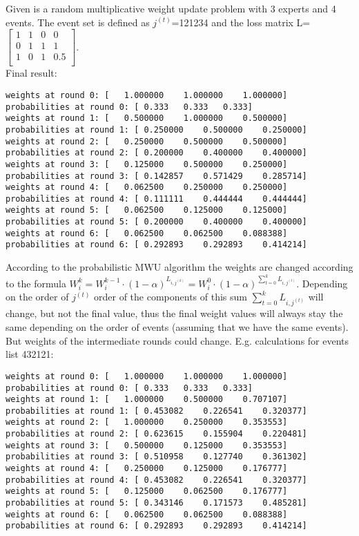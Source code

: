 
Given is a random multiplicative weight update problem with 3 experts and 4 events. The event set is defined as $j^{(t)}$=121234 and the loss matrix L=$ \begin{bmatrix}
1 & 1 & 0 & 0\\
0 & 1 & 1 & 1\\
1 & 0 & 1 & 0.5\\
\end{bmatrix}
$.\\
Final result:
\begin{verbatim}
weights at round 0: [	1.000000	1.000000	1.000000]
probabilities at round 0: [	0.333	0.333	0.333]
weights at round 1: [	0.500000	1.000000	0.500000]
probabilities at round 1: [	0.250000	0.500000	0.250000]
weights at round 2: [	0.250000	0.500000	0.500000]
probabilities at round 2: [	0.200000	0.400000	0.400000]
weights at round 3: [	0.125000	0.500000	0.250000]
probabilities at round 3: [	0.142857	0.571429	0.285714]
weights at round 4: [	0.062500	0.250000	0.250000]
probabilities at round 4: [	0.111111	0.444444	0.444444]
weights at round 5: [	0.062500	0.125000	0.125000]
probabilities at round 5: [	0.200000	0.400000	0.400000]
weights at round 6: [	0.062500	0.062500	0.088388]
probabilities at round 6: [	0.292893	0.292893	0.414214]
\end{verbatim}
According to the probabilistic MWU algorithm the weights are changed according to the formula $W_i^k = W_i^{k-1} \cdot (1 - \alpha)^{L_{i,j^{(k)}}} = W_i^0 \cdot (1-\alpha)^{\sum_{t=0}^k L_{i,j^{(t)}}}$. Depending on the order of $j^{(t)}$ order of the components of this sum $\sum_{t=0}^k L_{i,j^{(t)}}$ will change, but not the final value, thus the final weight values will always stay the same depending on the order of events (assuming that we have the same events). But weights of the intermediate rounds could change. E.g. calculations for events list 432121:

\begin{verbatim}
weights at round 0: [	1.000000	1.000000	1.000000]
probabilities at round 0: [	0.333	0.333	0.333]
weights at round 1: [	1.000000	0.500000	0.707107]
probabilities at round 1: [	0.453082	0.226541	0.320377]
weights at round 2: [	1.000000	0.250000	0.353553]
probabilities at round 2: [	0.623615	0.155904	0.220481]
weights at round 3: [	0.500000	0.125000	0.353553]
probabilities at round 3: [	0.510958	0.127740	0.361302]
weights at round 4: [	0.250000	0.125000	0.176777]
probabilities at round 4: [	0.453082	0.226541	0.320377]
weights at round 5: [	0.125000	0.062500	0.176777]
probabilities at round 5: [	0.343146	0.171573	0.485281]
weights at round 6: [	0.062500	0.062500	0.088388]
probabilities at round 6: [	0.292893	0.292893	0.414214]
\end{verbatim}

